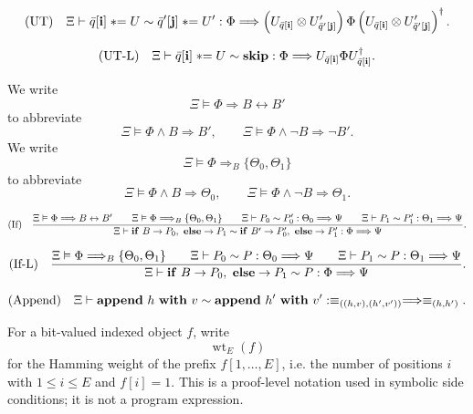 \documentclass[acmsmall,screen,review,anonymous,nonacm]{acmart}
\theoremstyle{defn_style}
\newcommand{\asteq}{\mathrel{*}=}
\begin{document}
\[
\text{\rm (UT)}
\quad
\Xi
\vdash
\bar q[\mathbf i]\asteq U
\sim
\bar q'[\mathbf j]\asteq U'
:
\Phi
\Longrightarrow
\left(
U_{\bar q[\mathbf i]}
\otimes
U'_{\bar q'[\mathbf j]}
\right)
\Phi
\left(
U_{\bar q[\mathbf i]}
\otimes
U'_{\bar q'[\mathbf j]}
\right)^{\dagger}.
\]

\[
\text{\rm (UT-L)}
\quad
\Xi
\vdash
\bar q[\mathbf i]\asteq U
\sim
\mathbf{skip}
:
\Phi
\Longrightarrow
U_{\bar q[\mathbf i]}
\Phi
U_{\bar q[\mathbf i]}^\dagger .
\]


We write
\[
\Xi
\vDash
\Phi\Longrightarrow B\leftrightarrow B'
\]
to abbreviate
\[
\Xi\vDash \Phi\land B\Longrightarrow B',
\qquad
\Xi\vDash \Phi\land\neg B\Longrightarrow \neg B'.
\]
We write
\[
\Xi
\vDash
\Phi\Longrightarrow_B\{\Theta_0,\Theta_1\}
\]
to abbreviate
\[
\Xi\vDash \Phi\land B\Longrightarrow\Theta_0,
\qquad
\Xi\vDash \Phi\land\neg B\Longrightarrow\Theta_1.
\]

\[
\text{\rm (If)}
\quad
\frac{
\Xi
\vDash
\Phi\Longrightarrow B\leftrightarrow B'
\qquad
\Xi
\vDash
\Phi\Longrightarrow_B\{\Theta_0,\Theta_1\}
\qquad
\Xi
\vdash
P_0\sim P'_0:
\Theta_0\Longrightarrow\Psi
\qquad
\Xi
\vdash
P_1\sim P'_1:
\Theta_1\Longrightarrow\Psi
}{
\Xi
\vdash
\mathbf{if}\ B\rightarrow P_0,\ \mathbf{else}\rightarrow P_1
\sim
\mathbf{if}\ B'\rightarrow P'_0,\ \mathbf{else}\rightarrow P'_1
:
\Phi
\Longrightarrow
\Psi
}.
\]

\[
\text{\rm (If-L)}
\quad
\frac{
\Xi
\vDash
\Phi\Longrightarrow_B\{\Theta_0,\Theta_1\}
\qquad
\Xi
\vdash
P_0\sim P:
\Theta_0\Longrightarrow\Psi
\qquad
\Xi
\vdash
P_1\sim P:
\Theta_1\Longrightarrow\Psi
}{
\Xi
\vdash
\mathbf{if}\ B\rightarrow P_0,\ \mathbf{else}\rightarrow P_1
\sim
P
:
\Phi
\Longrightarrow
\Psi
}.
\]

\[
\text{\rm (Append)}
\quad
\Xi
\vdash
\mathbf{append}\ h\ \mathbf{with}\ v
\sim
\mathbf{append}\ h'\ \mathbf{with}\ v'
:
\equiv_{((h,v),(h',v'))}
\Longrightarrow
\equiv_{(h,h')}.
\]

For a bit-valued indexed object \(f\), write
\[
\operatorname{wt}_{E}(f)
\]
for the Hamming weight of the prefix \(f[1,\ldots,E]\), i.e. the number
of positions \(i\) with \(1\le i\le E\) and \(f[i]=1\). This is a
proof-level notation used in symbolic side conditions; it is not a
program expression.
\end{document}
